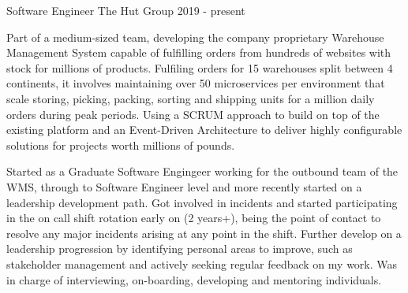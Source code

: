 \cventry
    {Software Engineer} %
    {The Hut Group} %
    {} %
    {2019 - present} %
    {\begin{cvitems}
        \item{Part of a medium-sized team, developing the company proprietary Warehouse Management System capable of fulfilling orders from hundreds 
        of websites with stock for millions of products. Fulfiling orders for 15 warehouses split between 4 continents, it involves maintaining over 50 microservices per environment
        that scale storing, picking, packing, sorting and shipping units for a million daily orders during peak periods. Using a SCRUM approach to build on top of the 
        existing platform and an Event-Driven Architecture to deliver highly configurable solutions for projects worth millions of pounds.}
        \item{Started as a Graduate Software Engingeer working for the outbound team of the WMS, through to Software Engineer level and more recently 
        started on a leadership development path. Got involved in incidents and started participating in the on call shift rotation early on (2 years+), being the point of contact to resolve
        any major incidents arising at any point in the shift. Further develop on a leadership progression by identifying personal areas to 
        improve, such as stakeholder management and actively seeking regular feedback on my work. Was in charge of interviewing, on-boarding, developing and mentoring individuals.}
    \end{cvitems}}

